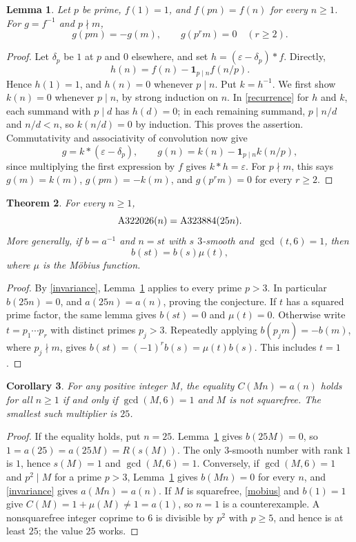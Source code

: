 \documentclass[11pt]{article}
\newtheorem{theorem}{Theorem}
\newtheorem{lemma}[theorem]{Lemma}
\newtheorem{corollary}[theorem]{Corollary}
\newcommand{\A}[1]{\textnormal{A#1}}
\begin{document}
\begin{lemma}\label{support}
Let $p$ be prime, $f(1)=1$, and $f(pn)=f(n)$ for every $n\geq1$.
For $g=f^{-1}$ and $p\nmid m$,
\[
 g(pm)=-g(m),\qquad g(p^r m)=0\quad(r\geq2).
\]
\end{lemma}
\begin{proof}
Let $\delta_p$ be $1$ at $p$ and $0$ elsewhere, and set
$h=(\varepsilon-\delta_p)*f$. Directly,
\[
 h(n)=f(n)-\mathbf1_{p\mid n}f(n/p).
\]
Hence $h(1)=1$, and $h(n)=0$ whenever $p\mid n$.
Put $k=h^{-1}$. We first show $k(n)=0$ whenever $p\mid n$,
by strong induction on $n$. In \eqref{recurrence} for $h$ and $k$,
each summand with $p\mid d$ has $h(d)=0$; in each remaining summand,
$p\mid n/d$ and $n/d<n$, so $k(n/d)=0$ by induction. This proves
the assertion. Commutativity and associativity of convolution now give
\[
 g=k*(\varepsilon-\delta_p),\qquad
 g(n)=k(n)-\mathbf1_{p\mid n}k(n/p),
\]
since multiplying the first expression by $f$ gives $k*h=\varepsilon$.
For $p\nmid m$, this says $g(m)=k(m)$, $g(pm)=-k(m)$, and
$g(p^r m)=0$ for every $r\geq2$.
\end{proof}

\begin{theorem}\label{main}
For every $n\geq1$,
\[
 \A{322026}(n)=\A{323884}(25n).
\]
More generally, if $b=a^{-1}$ and $n=s t$ with $s$ $3$-smooth and
$\gcd(t,6)=1$, then
\begin{equation}\label{mobius}
 b(st)=b(s)\mu(t),
\end{equation}
where $\mu$ is the M\"obius function.
\end{theorem}
\begin{proof}
By \eqref{invariance}, Lemma~\ref{support} applies to every prime $p>3$.
In particular $b(25n)=0$, and $a(25n)=a(n)$, proving the conjecture.
If $t$ has a squared prime factor, the same lemma gives $b(st)=0$
and $\mu(t)=0$. Otherwise write $t=p_1\cdots p_r$ with distinct primes
$p_j>3$. Repeatedly applying $b(p_j m)=-b(m)$, where $p_j\nmid m$,
gives $b(st)=(-1)^r b(s)=\mu(t)b(s)$. This includes $t=1$.
\end{proof}

\begin{corollary}\label{multipliers}
For any positive integer $M$, the equality
$C(Mn)=a(n)$ holds for all $n\geq1$ if and only if
$\gcd(M,6)=1$ and $M$ is not squarefree.
The smallest such multiplier is $25$.
\end{corollary}
\begin{proof}
If the equality holds, put $n=25$. Lemma~\ref{support} gives
$b(25M)=0$, so $1=a(25)=a(25M)=R(s(M))$.
The only $3$-smooth number with rank $1$ is $1$, hence $s(M)=1$
and $\gcd(M,6)=1$. Conversely, if $\gcd(M,6)=1$ and
$p^2\mid M$ for a prime $p>3$, Lemma~\ref{support} gives
$b(Mn)=0$ for every $n$, and \eqref{invariance} gives $a(Mn)=a(n)$.
If $M$ is squarefree, \eqref{mobius} and $b(1)=1$ give
$C(M)=1+\mu(M)\ne1=a(1)$, so $n=1$ is a counterexample.
A nonsquarefree integer coprime to $6$ is divisible by $p^2$ with
$p\geq5$, and hence is at least $25$; the value $25$ works.
\end{proof}
\end{document}
